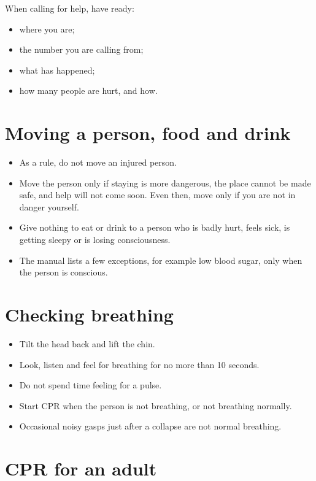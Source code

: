 When calling for help, have ready:
\begin{itemize}
\item where you are;
\item the number you are calling from;
\item what has happened;
\item how many people are hurt, and how.
\end{itemize}

\section*{Moving a person, food and drink}

\begin{itemize}
\item As a rule, do not move an injured person.
\item Move the person only if staying is more dangerous, the place cannot be made safe, and help will not come soon. Even then, move only if you are not in danger yourself.
\item Give nothing to eat or drink to a person who is badly hurt, feels sick, is getting sleepy or is losing consciousness.
\item The manual lists a few exceptions, for example low blood sugar, only when the person is conscious.
\end{itemize}

\section*{Checking breathing}

\begin{itemize}
\item Tilt the head back and lift the chin.
\item Look, listen and feel for breathing for no more than 10 seconds.
\item Do not spend time feeling for a pulse.
\item Start CPR when the person is not breathing, or not breathing normally.
\item Occasional noisy gasps just after a collapse are not normal breathing.
\end{itemize}

\section*{CPR for an adult}

